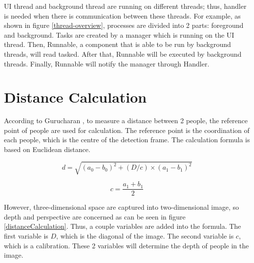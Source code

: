         UI thread and background thread are running on different threads;
        thus, handler is needed when there is communication between these threads.
        For example, as shown in figure \ref{thread-overview},
        processes are divided into 2 parts: foreground and background.
        Tasks are created by a manager which is running on the UI thread.
        Then, Runnable, a component that is able to be run by background threads, will read tasked.
        After that, Runnable will be executed by background threads.
        Finally, Runnable will notify the manager through Handler.

    \section{Distance Calculation}\label{sectionDistanceCalculation}
        According to Gurucharan \cite{SOCIAL-DISTANCING-DETECTION}, to measure a distance between 2 people, the reference point of people are used for calculation.
        The reference point is the coordination of each people, which is the centre of the detection frame.
        The calculation formula is based on Euclidean distance.

        \begin{equation*}
            d = \sqrt{(a_{0}-b_{0})^{2}+(D/c)\times(a_{1}-b_{1})^{2}}
        \end{equation*}

        \begin{equation*}
            c = \frac{a_{1}+b_{1}}{2}
        \end{equation*}

        However, three-dimensional space are captured into two-dimensional image,
        so depth and perspective are concerned as can be seen in figure \ref{distanceCalculation}.
        Thus, a couple variables are added into the formula.
        The first variable is $D$, which is the diagonal of the image.
        The second variable is $c$, which is a calibration.
        These 2 variables will determine the depth of people in the image.

